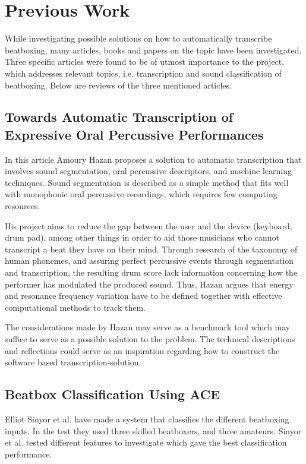 \section{Previous Work}
\label{sec:PW}
While investigating possible solutions on how to automatically transcribe beatboxing, many articles, books and papers on the topic have been investigated. Three specific articles were found to be of utmost importance to the project, which addresses relevant topics, i.e. transcription and sound classification of beatboxing. Below are reviews of the three mentioned articles.

\subsection{Towards Automatic Transcription of Expressive Oral Percussive Performances}
In this article Amoury Hazan \cite{Hazan2005} proposes a solution to automatic transcription that involves sound segmentation, oral percussive descriptors, and machine learning techniques. Sound segmentation is described as a simple method that fits well with monophonic oral percussive recordings, which requires few computing resources.	

His project aims to reduce the gap between the user and the device (keyboard, drum pad), among other things in order to aid those musicians who cannot transcript a beat they have on their mind.
Through research of the taxonomy of human phonemes, and assuring perfect percussive events through segmentation and transcription, the resulting drum score lack information concerning how the performer has modulated the produced sound. Thus, Hazan argues that energy and resonance frequency variation have to be defined together with effective computational methods to track them.

The considerations made by Hazan may serve as a benchmark tool which may suffice to serve as a possible solution to the problem. The technical descriptions and reflections could serve as an inspiration regarding how to construct the software based transcription-solution.

\subsection{Beatbox Classification Using ACE}
Elliot Sinyor et al. \cite{Sinyor05} have made a system that classifies the different beatboxing inputs. In the test they used three skilled beatboxers, and three amateurs. Sinyor et al. \cite{Sinyor05} tested different features to investigate which gave the best classification performance. 


